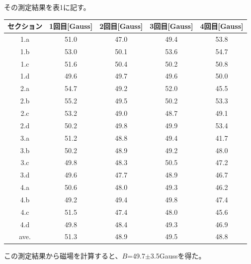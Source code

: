 その測定結果を表1に記す。
\begin{table}[H]
\begin{center}
\begin{tabular}{c|cccc}\hline
  セクション&1回目[Gauss]&2回目[Gauss]&3回目[Gauss]&4回目[Gauss]\\ \hline
  1.a & 51.0 & 47.0 & 49.4 & 53.8  \\
  1.b & 53.0 & 50.1 & 53.6 & 54.7  \\
  1.c & 51.6 & 50.4 & 50.2 & 50.8  \\
  1.d & 49.6 & 49.7 & 49.6 & 50.0  \\
  2.a & 54.7 & 49.2 & 52.0 & 45.5  \\
  2.b & 55.2 & 49.5 & 50.2 & 53.3  \\
  2.c & 53.2 & 49.0 & 48.7 & 49.1  \\
  2.d & 50.2 & 49.8 & 49.9 & 53.4  \\
  3.a & 51.2 & 48.8 & 49.4 & 41.7  \\
  3.b & 50.2 & 48.9 & 49.2 & 48.0  \\
  3.c & 49.8 & 48.3 & 50.5 & 47.2  \\
  3.d & 49.6 & 47.7 & 48.9 & 46.7  \\
  4.a & 50.6 & 48.0 & 49.3 & 46.2  \\
  4.b & 49.2 & 49.4 & 49.8 & 47.4  \\
  4.c & 51.5 & 47.4 & 48.0 & 45.6  \\
  4.d & 49.8 & 48.4 & 49.3 & 46.9  \\
  ave.& 51.3 & 48.9 & 49.5 & 48.8  \\
\end{tabular}
\end{center}
\end{table}
この測定結果から磁場を計算すると、$B$=49.7$\pm$3.5Gaussを得た。



